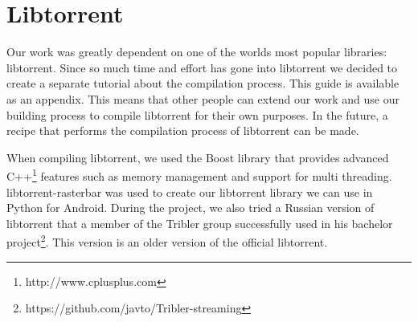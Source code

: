 \section{Libtorrent}
	Our work was greatly dependent on one of the worlds most popular libraries: libtorrent. Since so much time and effort has gone into libtorrent  we decided to create a separate tutorial about the compilation process. This guide is available as an appendix. This means that other people can extend our work and use our building process to compile libtorrent for their own purposes. In the future, a recipe that performs the compilation process of libtorrent can be made.
	
	When compiling libtorrent, we used the Boost library that provides advanced C++\footnote{http://www.cplusplus.com} features such as memory management and support for multi threading. libtorrent-rasterbar was used to create our libtorrent library we can use in Python for Android. During the project, we also tried a Russian version of libtorrent that a member of the Tribler group successfully used in his bachelor project\footnote{https://github.com/javto/Tribler-streaming}. This version is an older version of the official libtorrent.

